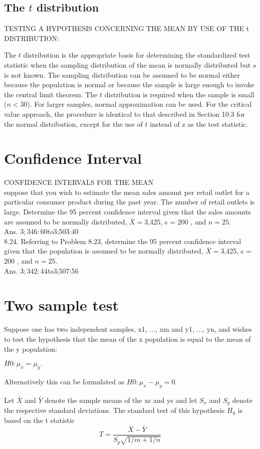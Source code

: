 \documentclass[12pt, a4paper]{report}
\theoremstyle{plain}
\theoremstyle{definition}
\theoremstyle{remark}
\begin{document}
\subsection{The $t$ distribution}
TESTING A HYPOTHESIS CONCERNING THE MEAN BY USE OF THE t
DISTRIBUTION:

The $t$ distribution is the appropriate basis for
determining the standardized test statistic when the sampling
distribution of the mean is normally distributed but $s$ is not
known. The sampling distribution can be assumed to be normal
either because the population is normal or because the sample is
large enough to invoke the central limit theorem. The $t$
distribution is required when the sample is small ($n < 30$). For
larger samples, normal approximation can be used. For the critical
value approach, the procedure is identical to that described in
Section 10.3 for the normal distribution, except for the use of $t$
instead of z as the test statistic.

\section{Confidence Interval} CONFIDENCE INTERVALS FOR THE MEAN\\
suppose that you wish to estimate the mean sales amount per
retail outlet for a particular consumer product during the past
year. The number of retail outlets is large. Determine the
95 percent confidence interval given that the sales amounts are
assumed to be normally distributed, $\bar{X} = $3,425, s = $200$ ,
and $n = 25.$\\ Ans. $3;346:60 to $3;503:40
\\
8.24. Referring to Problem 8.23, determine the 95 percent
confidence interval given that the population is assumed to be
normally distributed, $\bar{X} = $3,425, s = $200$ , and $n = 25.$
\\Ans. $3;342:44 to $3;507:56
\section{Two sample test}
Suppose one has two independent samples, x1, ..., xm and y1, ...,
yn, and wishes to test the hypothesis that the mean of the x
population is equal to the mean of the y population:

$H0 : \mu_{x} = \mu_{y}.$

Alternatively this can be formulated as $H0 : \mu_{x} - \mu_{y} =
0$.

Let $\bar{X}$ and $\bar{Y}$ denote the sample means of the xs and
ys and let $S_{x}$ and $S_{y}$ denote the respective standard
deviations. The standard test of this hypothesis $H_{0}$ is based
on the t statistic
\begin{equation}T = \frac{\bar{X} - \bar{Y} }{S_{p} \sqrt{1/m + 1/n} }
\end{equation}
\end{document}
